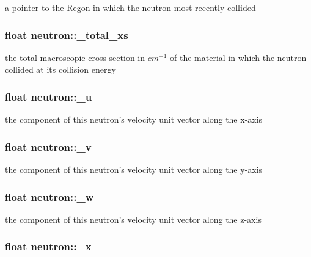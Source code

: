 a pointer to the Regon in which the neutron most recently collided \hypertarget{structneutron_aac01f1ff8efae019839d37bb959fa33f}{
\subsubsection[{\-\_\-total\-\_\-xs}]{\setlength{\rightskip}{0pt plus 5cm}float neutron\-::\-\_\-total\-\_\-xs}}\label{structneutron_aac01f1ff8efae019839d37bb959fa33f}
the total macroscopic cross-\/section in $cm^{-1}$ of the material in which the neutron collided at its collision energy \hypertarget{structneutron_a4ac5f314a0547708378d6b00a8863af0}{
\subsubsection[{\-\_\-u}]{\setlength{\rightskip}{0pt plus 5cm}float neutron\-::\-\_\-u}}\label{structneutron_a4ac5f314a0547708378d6b00a8863af0}
the component of this neutron's velocity unit vector along the x-\/axis \hypertarget{structneutron_a382ebb7a5a3c7b971b283f0eb2e14ea6}{
\subsubsection[{\-\_\-v}]{\setlength{\rightskip}{0pt plus 5cm}float neutron\-::\-\_\-v}}\label{structneutron_a382ebb7a5a3c7b971b283f0eb2e14ea6}
the component of this neutron's velocity unit vector along the y-\/axis \hypertarget{structneutron_a2556e63540e62a318ca919cbe24f9794}{
\subsubsection[{\-\_\-w}]{\setlength{\rightskip}{0pt plus 5cm}float neutron\-::\-\_\-w}}\label{structneutron_a2556e63540e62a318ca919cbe24f9794}
the component of this neutron's velocity unit vector along the z-\/axis \hypertarget{structneutron_a14743394ac7bf443a57bccf9ab8beba5}{
\subsubsection[{\-\_\-x}]{\setlength{\rightskip}{0pt plus 5cm}float neutron\-::\-\_\-x}}\label{structneutron_a14743394ac7bf443a57bccf9ab8beba5}
